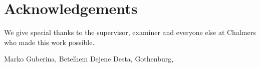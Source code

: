 \thispagestyle{plain}			%
\section*{Acknowledgements}
We give special thanks to the supervisor, examiner 
and everyone else at Chalmers who made this work possible.

\vspace{1.5cm}
\hfill
Marko Guberina, Betelhem Dejene Desta, Gothenburg, \monthname \space \the\year

\newpage				%
\thispagestyle{empty}
\mbox{}
